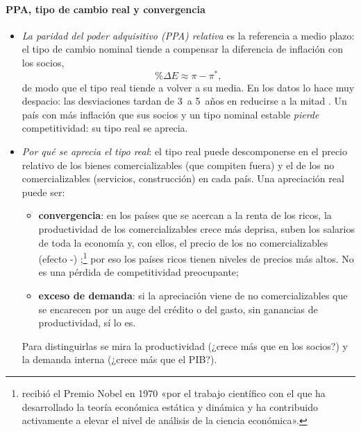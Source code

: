 \documentclass[11pt]{article}
\begin{document}
\paragraph{PPA, tipo de cambio real y convergencia}
\begin{itemize}
\item \emph{La paridad del poder adquisitivo (PPA) relativa} es la referencia a medio plazo: el tipo de cambio nominal tiende a compensar la diferencia de inflación con los socios,
\[
\%\Delta E\approx\pi-\pi^* ,
\]
  de modo que el tipo real tiende a volver a su media. En los datos lo hace muy despacio: las desviaciones tardan de 3~a 5~años en reducirse a la mitad \parencite{Rogoff1996PPA}. Un país con más inflación que sus socios y un tipo nominal estable \emph{pierde} competitividad: su tipo real se aprecia.
\item \emph{Por qué se aprecia el tipo real}: el tipo real puede descomponerse en el precio relativo de los bienes comercializables (que compiten fuera) y el de los no comercializables (servicios, construcción) en cada país. Una apreciación real puede ser:
  \begin{itemize}
  \item \textbf{convergencia}: en los países que se acercan a la renta de los ricos, la productividad de los comercializables crece más deprisa, suben los salarios de toda la economía y, con ellos, el precio de los no comercializables (efecto -) \parencite{Balassa1964,Samuelson1964};\footnote{ recibió el Premio Nobel en 1970 «por el trabajo científico con el que ha desarrollado la teoría económica estática y dinámica y ha contribuido activamente a elevar el nivel de análisis de la ciencia económica»\nocite{Nobel1970Samuelson}.} por eso los países ricos tienen niveles de precios más altos. No es una pérdida de competitividad preocupante;
  \item \textbf{exceso de demanda}: si la apreciación viene de no comercializables que se encarecen por un auge del crédito o del gasto, sin ganancias de productividad, sí lo es.
  \end{itemize}
  Para distinguirlas se mira la productividad (¿crece más que en los socios?) y la demanda interna (¿crece más que el PIB?).
\end{itemize}
\end{document}
